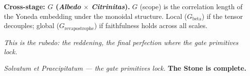 \documentclass[twocolumn]{article}
\begin{document}
\bigskip
\noindent\textbf{Cross-stage: $G$ (\emph{Albedo} $\times$ \emph{Citrinitas}).}
$G$ (scope) is the correlation length of the Yoneda embedding under the monoidal structure. Local ($G_{\text{beta}}$) if the tensor decouples; global ($G_{\text{revapostrophe}}$) if faithfulness holds across all scales.
\par\medskip
\textit{This is the \emph{rubedo}: the reddening, the final perfection where the gate primitives lock.}

\bigskip
\textit{Solvatum et Praecipitatum --- the gate primitives lock.}
\bigskip
\textbf{\Large The Stone is complete.}
\end{document}
